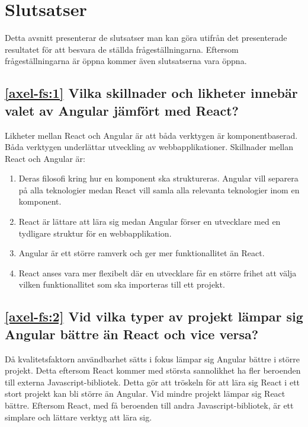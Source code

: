 \section{Slutsatser}
\label{sec:axel-conclusion}

Detta avsnitt presenterar de slutsatser man kan göra utifrån det presenterade resultatet för att besvara de ställda frågeställningarna. Eftersom frågeställningarna är öppna kommer även slutsatserna vara öppna.

\subsection*{\ref{axel-fs:1} Vilka skillnader och likheter innebär valet av Angular jämfört med React?}
Likheter mellan React och Angular är att båda verktygen är komponentbaserad. Båda verktygen underlättar utveckling av webbapplikationer. Skillnader mellan React och Angular är:
\begin{enumerate}
    \item Deras filosofi kring hur en komponent ska struktureras. Angular vill separera på alla teknologier medan React vill samla alla relevanta teknologier inom en komponent.

    \item React är lättare att lära sig medan Angular förser en utvecklare med en tydligare struktur för en webbapplikation.

    \item Angular är ett större ramverk och ger mer funktionallitet än React.

    \item React anses vara mer flexibelt där en utvecklare får en större frihet att välja vilken funktionallitet som ska importeras till ett projekt.
    
\end{enumerate}

\subsection*{\ref{axel-fs:2} Vid vilka typer av projekt lämpar sig Angular bättre än React och vice versa?}
Då kvalitetsfaktorn användbarhet sätts i fokus lämpar sig Angular bättre i större projekt. Detta eftersom React kommer med största sannolikhet ha fler beroenden till externa Javascript-bibliotek. Detta gör att tröskeln för att lära sig React i ett stort projekt kan bli större än Angular. Vid mindre projekt lämpar sig React bättre. Eftersom React, med få beroenden till andra Javascript-bibliotek, är ett simplare och lättare verktyg att lära sig.
 
